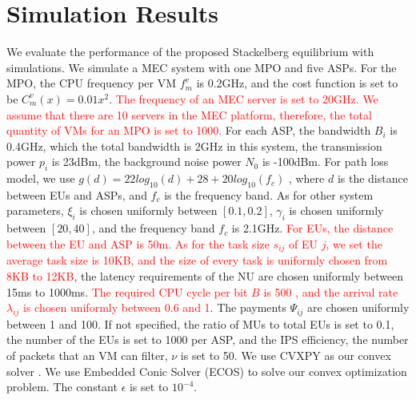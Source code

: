 \documentclass[10pt,journal, compsoc]{IEEEtran}
\begin{document}
\section{Simulation Results} \label{sec:simulation}
We evaluate the performance of the proposed Stackelberg equilibrium with simulations. We simulate a MEC system with one MPO and five ASPs\cite{Zhang3}\cite{Xu2}. For the MPO, the CPU frequency per VM $f_m^v$ is 0.2GHz, and the cost function is set to be $C_m^v(x) = 0.01x^2$. \textcolor{red}{The frequency of an MEC server is set to 20GHz\cite{Liu4}. We assume that there are 10 servers in the MEC platform, therefore, the total quantity of VMs for an MPO is set to 1000.} For each ASP, the bandwidth $B_i$ is 0.4GHz, which the total bandwidth is 2GHz in this system, the transmission power $p_i$ is 23dBm\cite{3gpp.36.101}, the background noise power $N_0$ is -100dBm\cite{chen2015efficient}. For path loss model, we use $g(d)=22log_{10}(d)+28+20log_{10}(f_c)$ \cite{3gpp.36.814}, where $d$ is the distance between EUs and ASPs, and $f_c$ is the frequency band. As for other system parameters, $\xi_{i}$ is chosen uniformly between $[0.1, 0.2]$, $\gamma_i$ is chosen uniformly between $[20, 40]$, and the frequency band $f_c$ is 2.1GHz\cite{Chang3}. \textcolor{red}{For EUs, the distance between the EU and ASP is 50m\cite{Mao}. As for the task size $s_{ij}$ of EU $j$, we set the average task size is 10KB\cite{Ko}, and the size of every task is uniformly chosen from 8KB to 12KB}, the latency requirements of the NU are chosen uniformly between 15ms to 1000ms. \textcolor{red}{The required CPU cycle per bit $B$ is 500 \cite{Ko}, and the arrival rate $\lambda_{ij}$ is chosen uniformly between 0.6 and 1\cite{Wu}}. The payments $\Psi_{ij}$ are chosen uniformly between 1 and 100. If not specified, the ratio of MUs to total EUs is set to 0.1, the number of the EUs is set to 1000 per ASP, and the IPS efficiency, the number of packets that an VM can filter, $\nu$ is set to 50. We use CVXPY \cite{diamond2016cvxpy} \cite{agrawal2018rewriting} as our convex solver . We use Embedded Conic Solver (ECOS) \cite{bib:Domahidi2013ecos} to solve our convex optimization problem. The constant $\epsilon$ is set to $10^{-4}$. 
\end{document}

